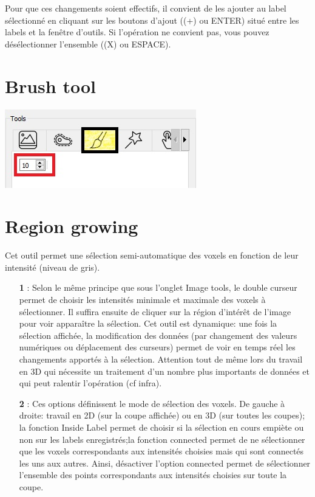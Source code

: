 \documentclass {article}
\begin{document}
Pour que ces changements soient effectifs, il convient de les ajouter au label sélectionné en cliquant sur les boutons d'ajout ((+) ou ENTER) situé entre les labels et la fenêtre d'outils. Si l'opération ne convient pas, vous pouvez désélectionner l'ensemble ((X) ou ESPACE).

\section{Brush tool}



\begin{center}
		\includegraphics{Iconographie/brush_tool.jpg}		
\end{center}



\section{Region growing}

Cet outil permet une sélection semi-automatique des voxels en fonction de leur intensité (niveau de gris).

\begin{itemize}
	\item[\textbf{1}]: Selon le même principe que sous l'onglet Image tools, le double curseur permet de choisir les intensités minimale et maximale des voxels à sélectionner. Il suffira ensuite de cliquer sur la région d'intérêt de l'image pour voir apparaître la sélection. Cet outil est dynamique: une fois la sélection affichée, la modification des données (par changement des valeurs numériques ou déplacement des curseurs) permet de voir en temps réel les changements apportés à la sélection. Attention tout de même lors du travail en 3D qui nécessite un traitement d'un nombre plus importants de données et qui peut ralentir l'opération (cf infra).
	\item[\textbf{2}]: Ces options définissent le mode de sélection des voxels. De gauche à droite: travail en 2D (sur la coupe affichée) ou en 3D (sur toutes les coupes); la fonction Inside Label permet de choisir si la sélection en cours empiète ou non sur les labels enregistrés;la fonction connected permet de ne sélectionner que les voxels correspondants aux intensités choisies mais qui sont connectés les uns aux autres. Ainsi, désactiver l'option connected permet de sélectionner l'ensemble des points correspondants aux intensités choisies sur toute la coupe.	
	
	
\end{itemize}
\end{document}
